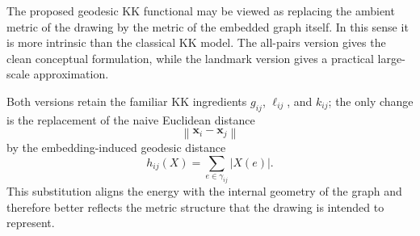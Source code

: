 \documentclass[11pt]{article}
\newcommand{\norm}[1]{\left\lVert #1 \right\rVert}
\newcommand{\vect}[1]{\mathbf{#1}}
\begin{document}
The proposed geodesic KK functional may be viewed as replacing the ambient metric of the
drawing by the metric of the embedded graph itself. In this sense it is more intrinsic than the
classical KK model. The all-pairs version gives the clean conceptual formulation, while the
landmark version gives a practical large-scale approximation.

Both versions retain the familiar KK ingredients $g_{ij}$, $\ell_{ij}$, and $k_{ij}$; the only
change is the replacement of the naive Euclidean distance
\[
\norm{\vect{x}_i-\vect{x}_j}
\]
by the embedding-induced geodesic distance
\[
h_{ij}(X)=\sum_{e\in\gamma_{ij}} |X(e)|.
\]
This substitution aligns the energy with the internal geometry of the graph and therefore
better reflects the metric structure that the drawing is intended to represent.



\end{document}
